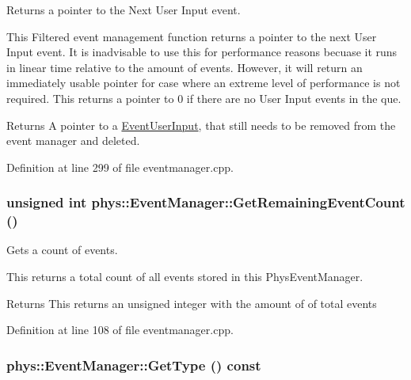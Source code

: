 Returns a pointer to the Next User Input event. 

This Filtered event management function returns a pointer to the next User Input event. It is inadvisable to use this for performance reasons becuase it runs in linear time relative to the amount of events. However, it will return an immediately usable pointer for case where an extreme level of performance is not required. This returns a pointer to 0 if there are no User Input events in the que. \begin{DoxyReturn}{Returns}
A pointer to a \hyperlink{classphys_1_1EventUserInput}{EventUserInput}, that still needs to be removed from the event manager and deleted. 
\end{DoxyReturn}


Definition at line 299 of file eventmanager.cpp.

\hypertarget{classphys_1_1EventManager_a67b755e3fe888e1305312d0f966f4a06}{
\subsubsection[{GetRemainingEventCount}]{\setlength{\rightskip}{0pt plus 5cm}unsigned int phys::EventManager::GetRemainingEventCount ()}}
\label{da/dde/classphys_1_1EventManager_a67b755e3fe888e1305312d0f966f4a06}


Gets a count of events. 

This returns a total count of all events stored in this PhysEventManager. \begin{DoxyReturn}{Returns}
This returns an unsigned integer with the amount of of total events 
\end{DoxyReturn}


Definition at line 108 of file eventmanager.cpp.

\hypertarget{classphys_1_1EventManager_a194890f7f8be5d45aa98623481482696}{
\subsubsection[{GetType}]{ phys::EventManager::GetType () const}}
\label{da/dde/classphys_1_1EventManager_a194890f7f8be5d45aa98623481482696}


